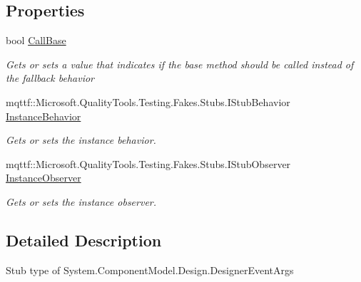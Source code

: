\subsection*{Properties}
\begin{DoxyCompactItemize}
\item 
bool \hyperlink{class_system_1_1_component_model_1_1_design_1_1_fakes_1_1_stub_designer_event_args_a5f8ff850fba6de3e92a8ce7dfddf477b}{Call\-Base}
\begin{DoxyCompactList}\small\item\em Gets or sets a value that indicates if the base method should be called instead of the fallback behavior\end{DoxyCompactList}\item 
mqttf\-::\-Microsoft.\-Quality\-Tools.\-Testing.\-Fakes.\-Stubs.\-I\-Stub\-Behavior \hyperlink{class_system_1_1_component_model_1_1_design_1_1_fakes_1_1_stub_designer_event_args_af6d7e08a48809bac32a4ab2cdf2e8a0a}{Instance\-Behavior}
\begin{DoxyCompactList}\small\item\em Gets or sets the instance behavior.\end{DoxyCompactList}\item 
mqttf\-::\-Microsoft.\-Quality\-Tools.\-Testing.\-Fakes.\-Stubs.\-I\-Stub\-Observer \hyperlink{class_system_1_1_component_model_1_1_design_1_1_fakes_1_1_stub_designer_event_args_ac615161b55ced30cbc863699cc3e92c9}{Instance\-Observer}
\begin{DoxyCompactList}\small\item\em Gets or sets the instance observer.\end{DoxyCompactList}\end{DoxyCompactItemize}


\subsection{Detailed Description}
Stub type of System.\-Component\-Model.\-Design.\-Designer\-Event\-Args



